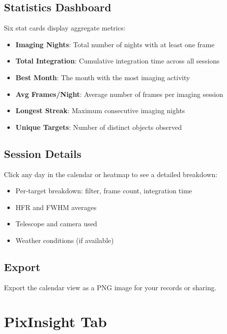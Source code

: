 \documentclass[11pt,a4paper]{article}
\begin{document}
\subsection{Statistics Dashboard}

Six stat cards display aggregate metrics:
\begin{itemize}
    \item \textbf{Imaging Nights}: Total number of nights with at least one frame
    \item \textbf{Total Integration}: Cumulative integration time across all sessions
    \item \textbf{Best Month}: The month with the most imaging activity
    \item \textbf{Avg Frames/Night}: Average number of frames per imaging session
    \item \textbf{Longest Streak}: Maximum consecutive imaging nights
    \item \textbf{Unique Targets}: Number of distinct objects observed
\end{itemize}

\subsection{Session Details}

Click any day in the calendar or heatmap to see a detailed breakdown:
\begin{itemize}
    \item Per-target breakdown: filter, frame count, integration time
    \item HFR and FWHM averages
    \item Telescope and camera used
    \item Weather conditions (if available)
\end{itemize}

\subsection{Export}

Export the calendar view as a PNG image for your records or sharing.


\section{PixInsight Tab}
\label{sec:pixinsight}
\end{document}
